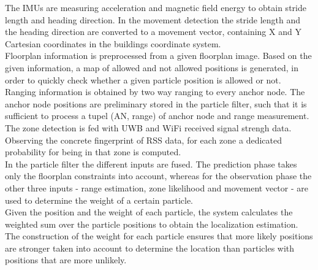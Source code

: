 \noindent\hspace*{5mm}%
The IMUs are measuring acceleration and magnetic field energy to obtain stride length and heading direction. In the movement detection the stride length and the heading direction are converted to a movement vector, containing X and Y Cartesian coordinates in the buildings coordinate system.\\
\noindent\hspace*{5mm}%
Floorplan information is preprocessed from a given floorplan image. Based on the given information, a map of allowed and not allowed positions is generated, in order to quickly check whether a given particle position is allowed or not.\\
\noindent\hspace*{5mm}%
Ranging information is obtained by two way ranging to every anchor node. The anchor node positions are preliminary stored in the particle filter, such that it is sufficient to process a tupel (AN, range) of anchor node and range measurement.\\
\noindent\hspace*{5mm}%
The zone detection is fed with UWB and WiFi received signal strengh data. Observing the concrete fingerprint of RSS data, for each zone a dedicated probability for being in that zone is computed.\\
\noindent\hspace*{5mm}%
In the particle filter the different inputs are fused. The prediction phase takes only the floorplan constraints into account, whereas for the observation phase the other three inputs - range estimation, zone likelihood and movement vector - are used to determine the weight of a certain particle.\\
\noindent\hspace*{5mm}%
Given the position and the weight of each particle, the system calculates the weighted sum over the particle positions to obtain the localization estimation. The construction of the weight for each particle ensures that more likely positions are stronger taken into account to determine the location than particles with positions that are more unlikely.